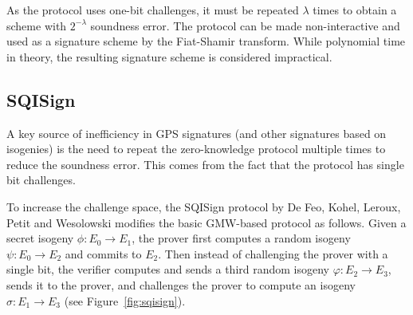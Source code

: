 As the protocol uses one-bit challenges, it must be repeated $\lambda$ times to obtain a scheme with $2^{-\lambda}$ soundness error.
The protocol can be made non-interactive and used as a signature scheme by the Fiat-Shamir transform. While polynomial time in theory, the resulting signature scheme is considered impractical.






\subsection{SQISign \label{sec:SQIsign}}

A key source of inefficiency in GPS signatures (and other signatures based on isogenies) is the need to repeat the zero-knowledge protocol multiple times to reduce the soundness error. This comes from the fact that the protocol has single bit challenges.


To increase the challenge space, the SQISign protocol by De Feo, Kohel, Leroux, Petit and Wesolowski modifies the basic GMW-based protocol as follows. Given a secret isogeny $\phi:E_0\rightarrow E_1$, the prover first computes a random isogeny $\psi:E_0\rightarrow E_2$ and commits to $E_2$. Then instead of challenging the prover with a single bit, the verifier computes and sends a third random isogeny $\varphi:E_2\rightarrow E_3$, sends it to the prover, and challenges the prover to compute an isogeny $\sigma:E_1\rightarrow E_3$ (see Figure~\ref{fig:sqisign}).

